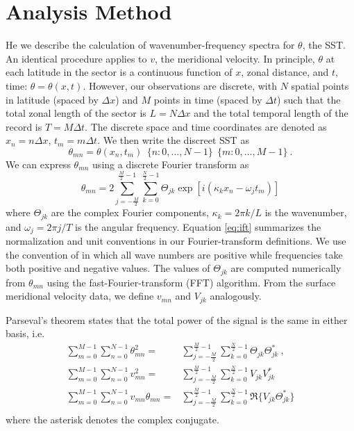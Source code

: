\documentclass[10pt]{article}
\begin{document}
\section{Analysis Method}

He we describe the calculation of wavenumber-frequency spectra for $\theta$, the SST. An identical procedure applies to $v$, the meridional velocity. In principle, $\theta$ at each latitude in the sector is a continuous function of $x$, zonal distance, and $t$, time: $\theta = \theta(x,t)$. However, our observations are discrete, with $N$ spatial points in latitude (spaced by $\Delta x$) and $M$ points in time (spaced by $\Delta t$) such that the total zonal length of the sector is $L = N \Delta x$ and the total temporal length of the record is $T = M \Delta t$. The discrete space and time coordinates are denoted as $x_n = n \Delta x$, $t_m = m \Delta t$. We then write the discreet SST as
\begin{equation}
\theta_{mn} = \theta( x_n, t_m ) \ \ \{n: 0, ..., N-1\} \ \ \{m: 0, ..., M-1\} \ .
\end{equation}
We can express $\theta_{mn}$ using a discrete Fourier transform as
\begin{equation}
\theta_{mn} = 2 \sum_{j=-\frac{M}{2}}^{\frac{M}{2}-1} \sum_{k=0}^{\frac{N}{2}-1} \Theta_{jk} \exp[ i (\kappa_k x_n - \omega_j t_m ) ] 
\label{eq:ift}
\end{equation}
where $\Theta_{jk}$ are the complex Fourier components, $\kappa_k = 2 \pi k / L$ is the wavenumber, and $\omega_j = 2 \pi j / T$ is the   angular frequency. %
Equation \eqref{eq:ift} summarizes the normalization and unit conventions in our Fourier-transform definitions.
We use the convention of \citet{RandelHeld1991} in which all wave numbers are positive while frequencies take both positive and negative values.  
The values of $\Theta_{jk}$ are computed numerically from $\theta_{mn}$ using the fast-Fourier-transform (FFT) algorithm. From the surface meridional velocity data, we define $v_{mn}$ and $V_{jk}$ analogously.

Parseval's theorem states that the total power of the signal is the same in either basis, i.e.
\begin{align}
\sum_{m=0}^{M-1} \sum_{n=0}^{N-1} \theta_{mn}^2 =& \sum_{j=-\frac{M}{2}}^{\frac{M}{2}-1} \sum_{k=0}^{\frac{N}{2}-1} \Theta_{jk}  \Theta_{jk}^\ast \ , \\ 
\sum_{m=0}^{M-1} \sum_{n=0}^{N-1} v_{mn}^2 =& \sum_{j=-\frac{M}{2}}^{\frac{M}{2}-1} \sum_{k=0}^{\frac{N}{2}-1} V_{jk}  V_{jk}^\ast \\
\sum_{m=0}^{M-1} \sum_{n=0}^{N-1} v_{mn} \theta_{mn} =& \sum_{j=-\frac{M}{2}}^{\frac{M}{2}-1} \sum_{k=0}^{\frac{N}{2}-1} \Re \{ V_{jk}  \Theta_{jk}^\ast \} \\
\end{align}
where the asterisk denotes the complex conjugate.
\end{document}
